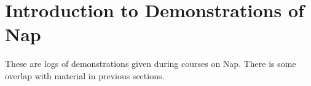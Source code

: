 
\section{Introduction to Demonstrations of Nap}
    \label{demo-intro}

  These are logs of demonstrations given during courses on
  Nap. There is some overlap with material in previous sections.
